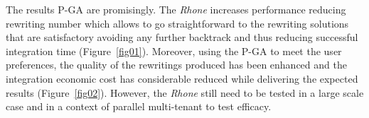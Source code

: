 
The results P-GA are promisingly.  
The \textit{Rhone} increases performance reducing rewriting number which allows to go straightforward to the rewriting solutions that are satisfactory avoiding any further backtrack and thus reducing successful integration time (Figure~\ref{fig01}). Moreover, using the P-GA to meet the user preferences, the quality of the rewritings produced has been enhanced and the integration economic cost has considerable reduced while delivering the expected results (Figure~\ref{fig02}). However, the \textit{Rhone} still need to be tested in a large scale case and in a context of parallel multi-tenant to test efficacy.






